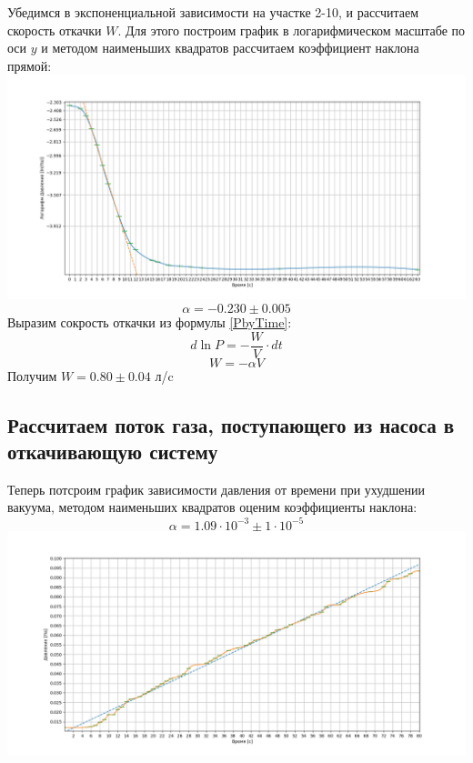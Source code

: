 \documentclass{article}
\begin{document}
Убедимся в экспоненциальной зависимости на участке 2-10, и рассчитаем скорость откачки $W$. Для этого построим график в логарифмическом масштабе по оси $y$ и методом наименьших квадратов рассчитаем коэффициент наклона прямой:\\
\includegraphics[scale = 0.3]{logPresurreByTime.png}
\begin{equation}
\alpha = -0.230 \pm 0.005
\end{equation}
Выразим сокрость откачки из формулы \eqref{PbyTime}:
\begin{equation}\label{difflnP}
    d\ln{P} = -\frac{W}{V}\cdot dt
\end{equation}
\begin{equation}\label{W}
    W = -\alpha V
\end{equation}
Получим $W = 0.80 \pm 0.04$ л/c
\subsection{Рассчитаем поток газа, поступающего из насоса в откачивающую систему}

Теперь потсроим график зависимости давления от времени при ухудшении вакуума, методом наименьших квадратов оценим коэффициенты наклона:
\begin{equation}
    \alpha = 1.09 \cdot 10^{-3} \pm 1 \cdot 10^{-5}
\end{equation}
\includegraphics[scale = 0.3]{pressurebyTimeExp2.png}
\end{document}
